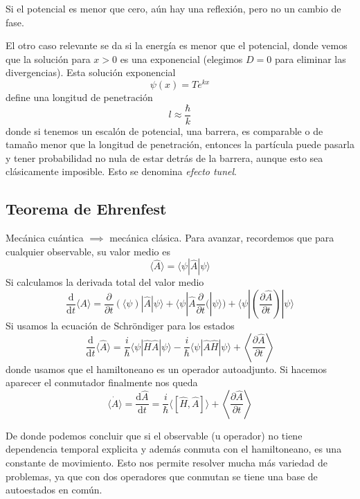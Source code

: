 \documentclass{book}
\numberwithin{equation}{section} %
\begin{document}
Si el potencial es menor que cero, aún hay una reflexión, pero no un cambio de fase.

El otro caso relevante se da si la energía es menor que el potencial, donde vemos que la solución para $x > 0$ es una exponencial (elegimos $D = 0$ para eliminar las divergencias).
Esta solución exponencial
\begin{equation}
    \psi(x) = T e^{k x}
\end{equation}
define una longitud de penetración 
\begin{equation}
    l \approx \frac{\hbar}{k}
\end{equation}
donde si tenemos un escalón de potencial, una barrera,  es comparable o de tamaño menor que la longitud de penetración, entonces la partícula puede pasarla y tener probabilidad no nula de estar detrás de la barrera, aunque esto sea clásicamente imposible.
Esto se denomina \emph{efecto tunel}.


\subsection{Teorema de Ehrenfest}
Mecánica cuántica $\implies$ mecánica clásica.
Para avanzar, recordemos que para cualquier observable, su valor medio es
\begin{equation}
    \langle \hat{A} \rangle = \langle \psi | \hat{A} | \psi \rangle
\end{equation}
Si calculamos la derivada total del valor medio
\[\frac{\mathrm{d}}{\mathrm{d}t} \langle A \rangle = \frac{\partial}{\partial t} (\langle \psi) | \hat{A} | \psi \rangle + \langle \psi | \hat{A} \frac{\partial}{\partial t} (|\psi\rangle) + \langle \psi | \left( \frac{\partial \hat{A}}{\partial t}\right) |\psi\rangle\]
Si usamos la ecuación de Schröndiger para los estados
\[\frac{\mathrm{d}}{\mathrm{d}t} \langle \hat{A} \rangle = \frac{i}{\hbar} \langle \psi | \hat{H} \hat{A} |\psi\rangle - \frac{i}{\hbar} \langle \psi | \hat{A} \hat{H} |\psi \rangle + \left< \frac{\partial \hat{A}}{\partial t} \right>\]
donde usamos que el hamiltoneano es un operador autoadjunto.
Si hacemos aparecer el conmutador finalmente nos queda
\begin{equation}
    \dot{\langle A \rangle} = \frac{\mathrm{d}\hat{A}}{\mathrm{d}t} = \frac{i}{\hbar} \langle[\hat{H}, \hat{A}]\rangle + \left<\frac{\partial \hat{A}}{\partial t} \right>
  \label{eq:vmedio_derivada_total}
\end{equation}

De donde podemos concluir que si el observable (u operador) no tiene dependencia temporal explicita y además conmuta con el hamiltoneano, es una constante de movimiento.
Esto nos permite resolver mucha más variedad de problemas, ya que con dos operadores que conmutan se tiene una base de autoestados en común.
\end{document}
